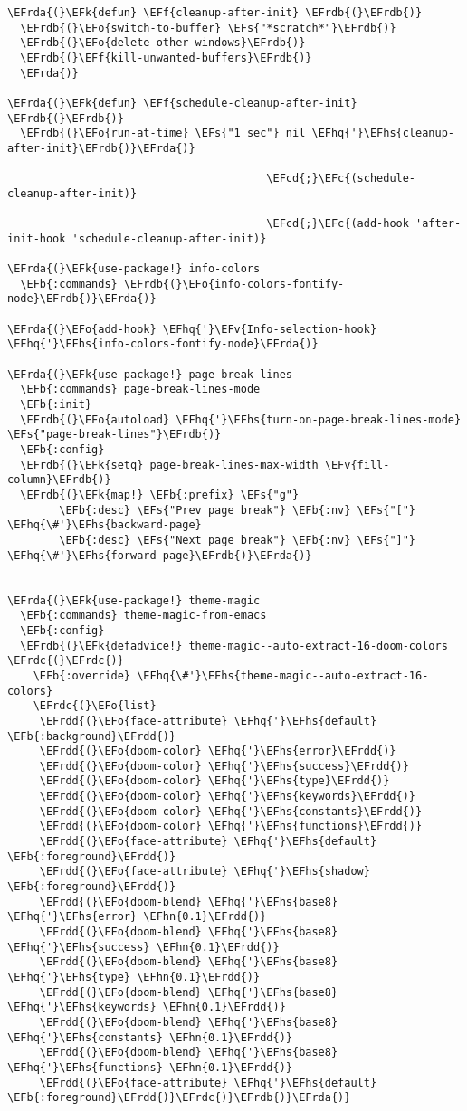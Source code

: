 \documentclass[a4wide,10pt]{article}
\newcommand{\EFc}[1]{\textcolor{EFc}{#1}} %
\newcommand{\EFcd}[1]{\textcolor{EFcd}{#1}} %
\newcommand{\EFs}[1]{\textcolor{EFs}{#1}} %
\newcommand{\EFk}[1]{\textcolor{EFk}{#1}} %
\newcommand{\EFb}[1]{\textcolor{EFb}{#1}} %
\newcommand{\EFf}[1]{\textcolor{EFf}{#1}} %
\newcommand{\EFv}[1]{\textcolor{EFv}{#1}} %
\newcommand{\EFo}[1]{\textcolor{EFo}{#1}} %
\newcommand{\EFhn}[1]{\textcolor{EFhn}{\textbf{#1}}} %
\newcommand{\EFhq}[1]{\textcolor{EFhq}{#1}} %
\newcommand{\EFhs}[1]{\textcolor{EFhs}{#1}} %
\newcommand{\EFrda}[1]{\textcolor{EFrda}{#1}} %
\newcommand{\EFrdb}[1]{\textcolor{EFrdb}{#1}} %
\newcommand{\EFrdc}[1]{\textcolor{EFrdc}{#1}} %
\newcommand{\EFrdd}[1]{\textcolor{EFrdd}{#1}} %
\begin{document}
\begin{Code}
\begin{Verbatim}
\EFrda{(}\EFk{defun} \EFf{cleanup-after-init} \EFrdb{(}\EFrdb{)}
  \EFrdb{(}\EFo{switch-to-buffer} \EFs{"*scratch*"}\EFrdb{)}
  \EFrdb{(}\EFo{delete-other-windows}\EFrdb{)}
  \EFrdb{(}\EFf{kill-unwanted-buffers}\EFrdb{)}
  \EFrda{)}

\EFrda{(}\EFk{defun} \EFf{schedule-cleanup-after-init} \EFrdb{(}\EFrdb{)}
  \EFrdb{(}\EFo{run-at-time} \EFs{"1 sec"} nil \EFhq{'}\EFhs{cleanup-after-init}\EFrdb{)}\EFrda{)}

                                        \EFcd{;}\EFc{(schedule-cleanup-after-init)}

                                        \EFcd{;}\EFc{(add-hook 'after-init-hook 'schedule-cleanup-after-init)}

\EFrda{(}\EFk{use-package!} info-colors
  \EFb{:commands} \EFrdb{(}\EFo{info-colors-fontify-node}\EFrdb{)}\EFrda{)}

\EFrda{(}\EFo{add-hook} \EFhq{'}\EFv{Info-selection-hook} \EFhq{'}\EFhs{info-colors-fontify-node}\EFrda{)}

\EFrda{(}\EFk{use-package!} page-break-lines
  \EFb{:commands} page-break-lines-mode
  \EFb{:init}
  \EFrdb{(}\EFo{autoload} \EFhq{'}\EFhs{turn-on-page-break-lines-mode} \EFs{"page-break-lines"}\EFrdb{)}
  \EFb{:config}
  \EFrdb{(}\EFk{setq} page-break-lines-max-width \EFv{fill-column}\EFrdb{)}
  \EFrdb{(}\EFk{map!} \EFb{:prefix} \EFs{"g"}
        \EFb{:desc} \EFs{"Prev page break"} \EFb{:nv} \EFs{"["} \EFhq{\#'}\EFhs{backward-page}
        \EFb{:desc} \EFs{"Next page break"} \EFb{:nv} \EFs{"]"} \EFhq{\#'}\EFhs{forward-page}\EFrdb{)}\EFrda{)}


\EFrda{(}\EFk{use-package!} theme-magic
  \EFb{:commands} theme-magic-from-emacs
  \EFb{:config}
  \EFrdb{(}\EFk{defadvice!} theme-magic--auto-extract-16-doom-colors \EFrdc{(}\EFrdc{)}
    \EFb{:override} \EFhq{\#'}\EFhs{theme-magic--auto-extract-16-colors}
    \EFrdc{(}\EFo{list}
     \EFrdd{(}\EFo{face-attribute} \EFhq{'}\EFhs{default} \EFb{:background}\EFrdd{)}
     \EFrdd{(}\EFo{doom-color} \EFhq{'}\EFhs{error}\EFrdd{)}
     \EFrdd{(}\EFo{doom-color} \EFhq{'}\EFhs{success}\EFrdd{)}
     \EFrdd{(}\EFo{doom-color} \EFhq{'}\EFhs{type}\EFrdd{)}
     \EFrdd{(}\EFo{doom-color} \EFhq{'}\EFhs{keywords}\EFrdd{)}
     \EFrdd{(}\EFo{doom-color} \EFhq{'}\EFhs{constants}\EFrdd{)}
     \EFrdd{(}\EFo{doom-color} \EFhq{'}\EFhs{functions}\EFrdd{)}
     \EFrdd{(}\EFo{face-attribute} \EFhq{'}\EFhs{default} \EFb{:foreground}\EFrdd{)}
     \EFrdd{(}\EFo{face-attribute} \EFhq{'}\EFhs{shadow} \EFb{:foreground}\EFrdd{)}
     \EFrdd{(}\EFo{doom-blend} \EFhq{'}\EFhs{base8} \EFhq{'}\EFhs{error} \EFhn{0.1}\EFrdd{)}
     \EFrdd{(}\EFo{doom-blend} \EFhq{'}\EFhs{base8} \EFhq{'}\EFhs{success} \EFhn{0.1}\EFrdd{)}
     \EFrdd{(}\EFo{doom-blend} \EFhq{'}\EFhs{base8} \EFhq{'}\EFhs{type} \EFhn{0.1}\EFrdd{)}
     \EFrdd{(}\EFo{doom-blend} \EFhq{'}\EFhs{base8} \EFhq{'}\EFhs{keywords} \EFhn{0.1}\EFrdd{)}
     \EFrdd{(}\EFo{doom-blend} \EFhq{'}\EFhs{base8} \EFhq{'}\EFhs{constants} \EFhn{0.1}\EFrdd{)}
     \EFrdd{(}\EFo{doom-blend} \EFhq{'}\EFhs{base8} \EFhq{'}\EFhs{functions} \EFhn{0.1}\EFrdd{)}
     \EFrdd{(}\EFo{face-attribute} \EFhq{'}\EFhs{default} \EFb{:foreground}\EFrdd{)}\EFrdc{)}\EFrdb{)}\EFrda{)}


\end{Verbatim}
\end{Code}
\end{document}
